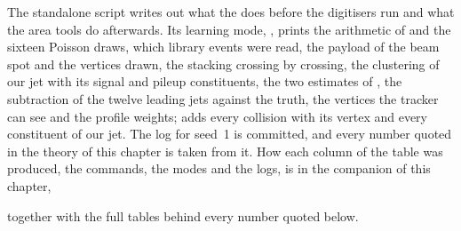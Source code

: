 The standalone script writes out what the \Mix does before the
digitisers run and what the \FASTJET area tools do afterwards. Its
learning mode, , prints the arithmetic of \mup and the sixteen
Poisson draws, which library events were read, the payload of the beam
spot and the vertices drawn, the stacking crossing by crossing, the
clustering of our jet with its signal and pileup constituents, the two
estimates of \rhoPU, the subtraction of the twelve leading jets against
the truth, the vertices the tracker can see and the profile weights;
 adds every collision with its vertex and every constituent of
our jet. The  log for seed~1 is committed, and every number
quoted in the theory of this chapter is taken from it. How each column of
the table was produced, the commands, the modes and the logs, is in the
companion of this chapter,
\begin{center}
\end{center}
together with the full tables behind every number quoted below.

